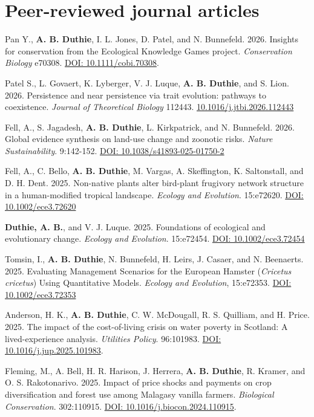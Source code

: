 \documentclass[letterpaper]{article}
\begin{document}
\section*{Peer-reviewed journal articles}
\begin{etaremune}
\item Pan Y., {\bf A. B. Duthie}, I. L. Jones, D. Patel, and N. Bunnefeld. 2026. Insights for conservation from the Ecological Knowledge Games project. \textit{Conservation Biology} e70308. \href{https://doi.org/10.1111/cobi.70308}{DOI: 10.1111/cobi.70308}.
\item Patel S., L. Govaert, K. Lyberger, V. J. Luque, {\bf A. B. Duthie}, and S. Lion. 2026. Persistence and near persistence via trait evolution: pathways to coexistence. \textit{Journal of Theoretical Biology} 112443. \href{https://doi.org/10.1016/j.jtbi.2026.112443}{10.1016/j.jtbi.2026.112443} 
\item Fell, A., S. Jagadesh, {\bf A. B. Duthie}, L. Kirkpatrick, and N. Bunnefeld. 2026. Global evidence synthesis on land-use change and zoonotic risks. \textit{Nature Sustainability}. 9:142-152. \href{https://doi.org/10.1038/s41893-025-01750-2}{DOI: 10.1038/s41893-025-01750-2}
\item Fell, A., C. Bello, {\bf A. B. Duthie}, M. Vargas, A. Skeffington, K. Saltonstall, and D. H. Dent. 2025. Non-native plants alter bird-plant frugivory network structure in a human-modified tropical landscape. \textit{Ecology and Evolution}. 15:e72620. \href{https://doi.org/10.1002/ece3.72620}{DOI: 10.1002/ece3.72620}
\item {\bf Duthie, A. B.}, and V. J. Luque. 2025. Foundations of ecological and evolutionary change. \textit{Ecology and Evolution}. 15:e72454. \href{https://doi.org/10.1002/ece3.72454}{DOI: 10.1002/ece3.72454}
\item Tomsin, I., {\bf A. B. Duthie}, N. Bunnefeld, H. Leirs, J. Casaer, and N. Beenaerts. 2025. Evaluating Management Scenarios for the European Hamster (\textit{Cricetus cricetus}) Using Quantitative Models. \textit{Ecology and Evolution}, 15:e72353. \href{https://doi.org/10.1002/ece3.72353}{DOI: 10.1002/ece3.72353}
\item Anderson, H. K., {\bf A. B. Duthie}, C. W. McDougall, R. S. Quilliam, and H. Price. 2025. The impact of the cost-of-living crisis on water poverty in Scotland: A lived-experience analysis. {\it Utilities Policy}. 96:101983. \href{https://doi.org/10.1016/j.jup.2025.101983}{DOI: 10.1016/j.jup.2025.101983}.
\item Fleming, M., A. Bell, H. R. Harison, J. Herrera, {\bf A. B. Duthie}, R. Kramer, and O. S. Rakotonarivo. 2025. Impact of price shocks and payments on crop diversification and forest use among Malagasy vanilla farmers. {\it Biological Conservation}. 302:110915. \href{https://www.sciencedirect.com/science/article/pii/S0006320724004774?dgcid=coauthor}{DOI: 10.1016/j.biocon.2024.110915}.

\end{etaremune}
\end{document}
